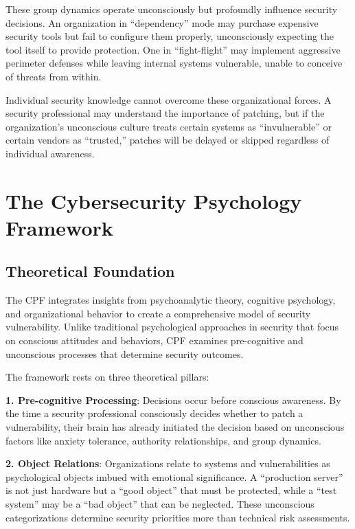 \documentclass[11pt,a4paper]{article}
\begin{document}
These group dynamics operate unconsciously but profoundly influence security decisions. An organization in ``dependency'' mode may purchase expensive security tools but fail to configure them properly, unconsciously expecting the tool itself to provide protection. One in ``fight-flight'' may implement aggressive perimeter defenses while leaving internal systems vulnerable, unable to conceive of threats from within.

Individual security knowledge cannot overcome these organizational forces. A security professional may understand the importance of patching, but if the organization's unconscious culture treats certain systems as ``invulnerable'' or certain vendors as ``trusted,'' patches will be delayed or skipped regardless of individual awareness.

\section{The Cybersecurity Psychology Framework}

\subsection{Theoretical Foundation}

The CPF integrates insights from psychoanalytic theory, cognitive psychology, and organizational behavior to create a comprehensive model of security vulnerability. Unlike traditional psychological approaches in security that focus on conscious attitudes and behaviors, CPF examines pre-cognitive and unconscious processes that determine security outcomes.

The framework rests on three theoretical pillars:

\textbf{1. Pre-cognitive Processing}: Decisions occur before conscious awareness\cite{libet1983}. By the time a security professional consciously decides whether to patch a vulnerability, their brain has already initiated the decision based on unconscious factors like anxiety tolerance, authority relationships, and group dynamics.

\textbf{2. Object Relations}: Organizations relate to systems and vulnerabilities as psychological objects imbued with emotional significance\cite{klein1946}. A ``production server'' is not just hardware but a ``good object'' that must be protected, while a ``test system'' may be a ``bad object'' that can be neglected. These unconscious categorizations determine security priorities more than technical risk assessments.
\end{document}
